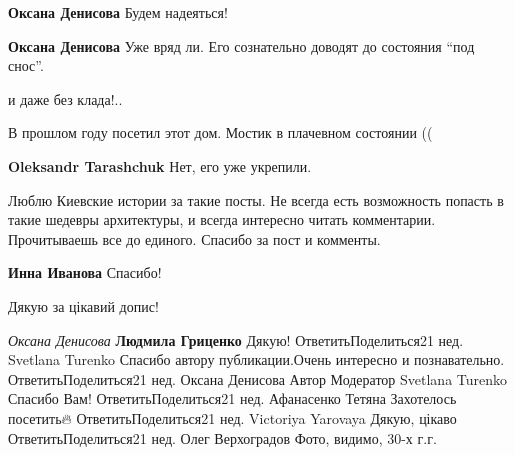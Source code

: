 \begin{itemize}
\begin{itemize}
\textbf{Оксана Денисова} Будем надеяться!

\textbf{Оксана Денисова} Уже вряд ли. Его сознательно доводят до состояния \enquote{под снос}.


и даже без клада!..
\end{itemize} %

В прошлом году посетил этот дом. Мостик в плачевном состоянии ((

\textbf{Oleksandr Tarashchuk} Нет, его уже укрепили.


Люблю Киевские истории за такие посты. Не всегда есть возможность попасть в
такие шедевры архитектуры, и всегда интересно читать комментарии. Прочитываешь
все до единого. Спасибо за пост и комменты.


\textbf{Инна Иванова} Спасибо!

Дякую за цікавий допис!

\emph{Оксана Денисова}
\textbf{Людмила Гриценко} Дякую!
ОтветитьПоделиться21 нед.
Svetlana Turenko
Спасибо автору публикации.Очень
интересно и познавательно.
ОтветитьПоделиться21 нед.
Оксана Денисова
Автор
Модератор
Svetlana Turenko Спасибо Вам!
ОтветитьПоделиться21 нед.
Афанасенко Тетяна
Захотелось посетить🔥
ОтветитьПоделиться21 нед.
Victoriya Yarovaya
Дякую, цікаво
ОтветитьПоделиться21 нед.
Олег Верхоградов
Фото, видимо, 30-х г.г.

\end{itemize} %
